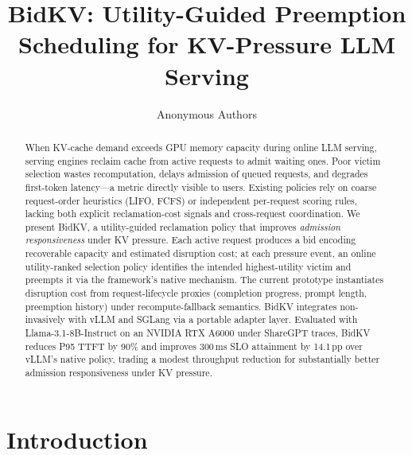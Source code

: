 \documentclass[sigconf,nonacm]{acmart}
\begin{document}
\title{BidKV: Utility-Guided Preemption Scheduling for KV-Pressure LLM Serving}

\author{Anonymous Authors}

\begin{abstract}
When KV-cache demand exceeds GPU memory capacity during online LLM serving, serving engines reclaim cache from active requests to admit waiting ones. Poor victim selection wastes recomputation, delays admission of queued requests, and degrades first-token latency---a metric directly visible to users. Existing policies rely on coarse request-order heuristics (LIFO, FCFS) or independent per-request scoring rules, lacking both explicit reclamation-cost signals and cross-request coordination. We present BidKV, a utility-guided reclamation policy that improves \emph{admission responsiveness} under KV pressure. Each active request produces a bid encoding recoverable capacity and estimated disruption cost; at each pressure event, an online utility-ranked selection policy identifies the intended highest-utility victim and preempts it via the framework's native mechanism. The current prototype instantiates disruption cost from request-lifecycle proxies (completion progress, prompt length, preemption history) under recompute-fallback semantics. BidKV integrates non-invasively with vLLM and SGLang via a portable adapter layer. Evaluated with Llama-3.1-8B-Instruct on an NVIDIA RTX A6000 under ShareGPT traces, BidKV reduces P95 TTFT by 90\% and improves 300\,ms SLO attainment by 14.1\,pp over vLLM's native policy, trading a modest throughput reduction for substantially better admission responsiveness under KV pressure.
\end{abstract}

\maketitle

\section{Introduction}\label{sec:intro}
\end{document}
